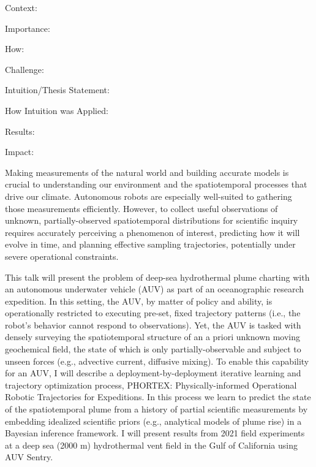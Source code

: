 % 
% 
%

Context:

Importance:

How:

Challenge:

Intuition/Thesis Statement:

How Intuition was Applied:

Results:

Impact:


Making measurements of the natural world and building accurate models is crucial to understanding our environment and the spatiotemporal processes that drive our climate. Autonomous robots are especially well-suited to gathering those measurements efficiently. However, to collect useful observations of unknown, partially-observed spatiotemporal distributions for scientific inquiry requires accurately perceiving a phenomenon of interest, predicting how it will evolve in time, and planning effective sampling trajectories, potentially under severe operational constraints.

This talk will present the problem of deep-sea hydrothermal plume charting with an autonomous underwater vehicle (AUV) as part of an oceanographic research expedition. In this setting, the AUV, by matter of policy and ability, is operationally restricted to executing pre-set, fixed trajectory patterns (i.e., the robot’s behavior cannot respond to observations). Yet, the AUV is tasked with densely surveying the spatiotemporal structure of an a priori unknown moving geochemical field, the state of which is only partially-observable and subject to unseen forces (e.g., advective current, diffusive mixing). To enable this capability for an AUV, I will describe a deployment-by-deployment iterative learning and trajectory optimization process, PHORTEX: Physically-informed Operational Robotic Trajectories for Expeditions. In this process we learn to predict the state of the spatiotemporal plume from a history of partial scientific measurements by embedding idealized scientific priors (e.g., analytical models of plume rise) in a Bayesian inference framework. I will present results from 2021 field experiments at a deep sea (2000 m) hydrothermal vent field in the Gulf of California using AUV Sentry.

